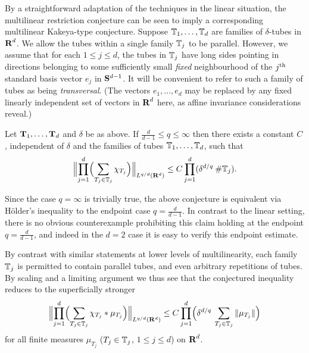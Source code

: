 By a straightforward adaptation of the techniques in the linear
situation, the multilinear restriction conjecture can be seen to
imply a corresponding multilinear Kakeya-type conjecture. Suppose
${\mathbb{T}}_{1},\hdots,{\mathbb{T}}_{d}$ are families of $\delta$-tubes in
${\hbox{\bf R}}^d$. We allow the tubes within a single family ${\mathbb{T}}_j$ to be parallel.
However, we assume that for each $1\leq j\leq d$, the tubes
in ${\mathbb{T}}_{j}$ have long sides pointing in directions belonging
to some sufficiently small \textit{fixed} neighbourhood of the
$j^{{\operatorname{th}}}$ standard basis vector $e_{j}$ in ${\bf S}^{d-1}$. It will
be convenient to refer to such a family of tubes as being
\textit{transversal}. (The vectors $e_{1},\hdots,e_{d}$ may be
replaced by any fixed linearly independent set of vectors in
${\hbox{\bf R}}^d$ here, as affine invariance considerations reveal.)
\begin{conjecture}\label{MLKC}
Let ${\hbox{\bf T}}_1,\ldots,{\hbox{\bf T}}_d$ and $\delta$ be as above.
If $\tfrac{d}{d-1}\leq q\leq\infty$ then there exists a constant
$C$, independent of $\delta$ and the families of tubes
${\mathbb{T}}_{1},\hdots,{\mathbb{T}}_{d}$, such that
\begin{equation}\label{mk}
\Bigl\|\prod_{j=1}^{d}\Bigl(\sum_{T_{j}\in{\mathbb{T}}_{j}}\chi_{T_{j}}\Bigr)\Bigr\|_{L^{q/d}({\bf
R}^d)}\leq C\prod_{j=1}^{d}(\delta^{d/q}\: \mbox{\#}{\mathbb{T}}_{j}).
\end{equation}
\end{conjecture}
\begin{remark}
Since the case $q=\infty$ is trivially true, the above conjecture
is equivalent via H\"older's inequality
to the endpoint case $q=\tfrac{d}{d-1}$.  In contrast to the linear setting,
there is no obvious counterexample prohibiting this claim holding at the endpoint
$q = \tfrac{d}{d-1}$, and indeed in the $d=2$ case it is easy to verify this endpoint estimate.
\end{remark}
\begin{remark}\label{superficial}
By contrast with similar statements at lower levels of multilinearity,
each family ${\mathbb{T}}_j$ is permitted to contain parallel tubes, and
even arbitrary repetitions of tubes. By scaling and a limiting argument
we thus see that
the conjectured inequality reduces
to the superficially
stronger
\begin{equation}\label{coefficients}
\Bigl\|\prod_{j=1}^{d}\Bigl(\sum_{T_{j}\in{\mathbb{T}}_{j}}\chi_{T_{j}}*\mu_{T_{j}}\Bigr)\Bigr\|_{L^{q/d}({\bf
R}^d)} \leq C \prod_{j=1}^{d}\Bigl(\delta^{d/q}\:
\sum_{T_{j}\in{\mathbb{T}}_{j}}\|\mu_{T_{j}}\|\Bigr)
\end{equation}
for all finite measures $\mu_{T_{j}}$ ($T_j\in{\mathbb{T}}_j$,
$1\leq j\leq d$) on ${\hbox{\bf R}}^d$.
\end{remark}
